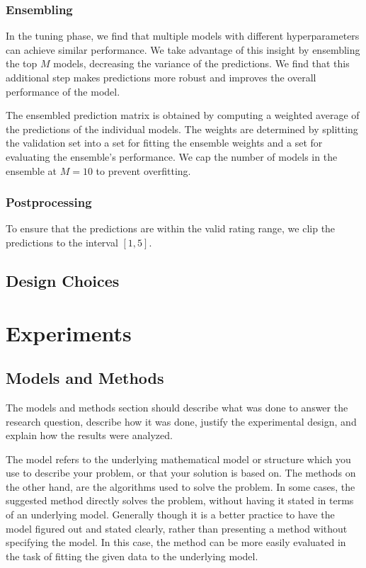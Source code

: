 \documentclass[10pt,conference,compsocconf]{IEEEtran}
\begin{document}
\subsubsection{Ensembling}
In the tuning phase, we find that multiple models with different hyperparameters can achieve similar performance.
We take advantage of this insight by ensembling the top $M$ models, decreasing the variance of the predictions.
We find that this additional step makes predictions more robust and improves the overall performance of the model.

The ensembled prediction matrix is obtained by computing a weighted average of the predictions of the individual models.
The weights are determined by splitting the validation set into a set for fitting the ensemble weights and a set for evaluating the ensemble's performance.
We cap the number of models in the ensemble at $M=10$ to prevent overfitting.
\subsubsection{Postprocessing}
To ensure that the predictions are within the valid rating range, we clip the predictions to the interval $[1, 5]$.


\subsection{Design Choices}


\section{Experiments}


\subsection{Models and Methods}
The models and methods
section should describe what was
done to answer the research question, describe how it was done,
justify the experimental design, and
explain how the results were analyzed.

The model refers to the underlying mathematical model or structure which 
you use to describe your problem, or that your solution is based on. 
The methods on the other hand, are the algorithms used to solve the problem. 
In some cases, the suggested method directly solves the problem, without having it 
stated in terms of an underlying model. Generally though it is a better practice to have 
the model figured out and stated clearly, rather than presenting a method without specifying 
the model. In this case, the method can be more easily evaluated in the task of fitting 
the given data to the underlying model.
\end{document}
